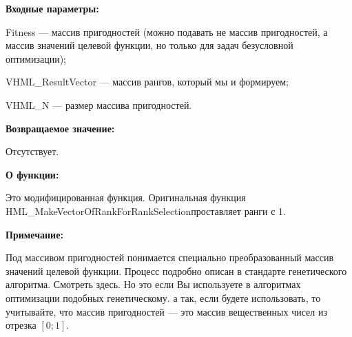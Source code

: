 \textbf{Входные параметры:}

 Fitness --- массив пригодностей (можно подавать не массив пригодностей, а массив значений целевой функции, но только для задач безусловной оптимизации);
 
 VHML\_ResultVector --- массив рангов, который мы и формируем;
 
 VHML\_N --- размер массива пригодностей.
 
\textbf{Возвращаемое значение:} 
 
Отсутствует.
 
\textbf{О функции:}

Это модифицированная функция. Оригинальная функция HML\_MakeVectorOfRankForRankSelectionпроставляет ранги с 1.

\textbf{Примечание:}

 Под массивом пригодностей понимается специально преобразованный массив значений целевой функции. Процесс подробно описан в стандарте генетического алгоритма. Смотреть здесь. Но это если Вы используете в алгоритмах оптимизации подобных генетическому. а так, если будете использовать, то учитывайте, что массив пригодностей --- это массив вещественных чисел из отрезка $[0;1]$.
